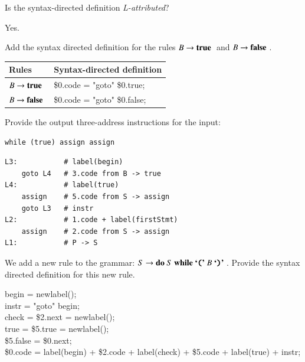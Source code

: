 \documentclass[12pt]{article}
\newcommand{\term}[1]{\mbox{\textbf{#1}\ }}
\newcommand{\termchar}[1]{\mbox{\textbf{`\texttt{#1}'}\ }}
\begin{document}
\begin{exe}
\begin{xlist}
{\ex Is the syntax-directed definition {\em L-attributed}?
\begin{soln} Yes. \end{soln}
}

{\ex Add the syntax directed definition for the rules $B \rightarrow \term{true}$
and $B \rightarrow \term{false}$.
\begin{soln}
  \begin{center}
    \begin{tabular}{|ll|}
      \hline
      \hline
      Rules & Syntax-directed definition\\
      \hline
      \hline
      $B \rightarrow \term{true}$
      & \$0.code = "goto" \$0.true; \\
      \hline
      $B \rightarrow \term{false}$
      & \$0.code = "goto" \$0.false; \\
      \hline
      \hline
    \end{tabular}
  \end{center}
\end{soln}
}

{\ex Provide the output three-address instructions for the input:
{\small
\begin{verbatim}
while (true) assign assign
\end{verbatim}
}
\begin{soln}
{\small
\begin{verbatim}
L3:           # label(begin)
    goto L4   # 3.code from B -> true
L4:           # label(true)
    assign    # 5.code from S -> assign
    goto L3   # instr
L2:           # 1.code + label(firstStmt) 
    assign    # 2.code from S -> assign
L1:           # P -> S
\end{verbatim}
}
\end{soln}
}

{\ex We add a new rule to the grammar: 
$S \rightarrow \term{do} S\ \term{while} \termchar{(} B\ \termchar{)}$. 
Provide the syntax directed definition for this new rule.

\begin{soln}

\noindent
begin = newlabel(); \\
instr = "goto" begin; \\
check = \$2.next = newlabel(); \\
true = \$5.true = newlabel(); \\
\$5.false = \$0.next; \\
\$0.code = label(begin) + \$2.code + label(check) + \$5.code + label(true) + instr; 
\end{soln}
}


\end{xlist}
\end{exe}
\end{document}
